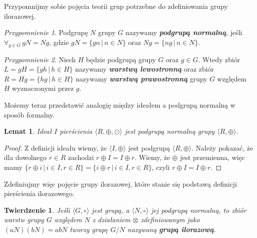 \documentclass[polish,declaration,shortabstract]{iithesis}
\theoremstyle{definition}
\theoremstyle{remark} \newtheorem{observation}{Obserwacja}
\theoremstyle{plain} \newtheorem{theorem}{Twierdzenie}
\theoremstyle{plain} \newtheorem{lemma}{Lemat}
\theoremstyle{remark} \newtheorem*{remark*}{Uwaga}
\theoremstyle{reminder} \newtheorem*{reminder*}{Przypomnienie}
\begin{document}
Przypomnijmy sobie pojęcia teorii grup potrzebne do zdefiniowania grupy ilorazowej.
\begin{reminder*}
	Podgrupę $N$ grupy $G$ nazywamy \textit{\textbf{podgrupą normalną}}, jeśli $\forall_{g \in G} \, gN = Ng$, gdzie $gN = \{gn \, | \, n \in N\}$ oraz $Ng = \{ng \, | \, n \in N\}$.
\end{reminder*}

\begin{reminder*}
    Niech $H$ będzie podgrupą grupy $G$ oraz $g \in G$. Wtedy zbiór 
    $L = gH = \{gh \, | \, h \in H\}$ nazywamy \textbf{\textit{warstwą lewostronną}} oraz zbiór $R = Hg = \{hg \, | \, h \in H\}$ nazywamy \textbf{\textit{warstwą prawostronną}} grupy $G$ względem $H$ wyznaczonymi przez $g$.
\end{reminder*}

Możemy teraz przedstawić analogię między ideałem a podgrupą normalną w sposób formalny.

\begin{lemma}
	Ideał $I$ pierścienia $\langle R, \oplus, \odot \rangle$ jest podgrupą normalną grupy $\langle R, \oplus \rangle$.
\end{lemma}

\begin{proof}
	Z definicji ideału wiemy, że $\langle I, \oplus \rangle$ jest podgrupą $\langle R, \oplus \rangle$. \newline
	Należy pokazać, że dla dowolnego $r \in R$ zachodzi $r \oplus I = I \oplus r$. Wiemy, że $\oplus$ jest przemienna, więc mamy ${\{r \oplus i \, | \, i \in I, r \in R\}} = {\{i \oplus r \, | \, i \in I, r \in R\}}$, czyli $r \oplus I = I \oplus r$.
\end{proof}

Zdefiniujmy więc pojęcie grupy ilorazowej, które stanie się podstawą definicji pierścienia ilorazowego.

\theoremstyle{theorem}\label{grup_ilo}
\begin{theorem}
	Jeśli $\langle G, \circ \rangle$ jest grupą, a $\langle N, \circ \rangle$ jej podgrupą normalną, to zbiór warstw grupy $G$ względem $N$ z działaniem $\otimes$ zdefiniowanym jako $(aN)(bN) = abN$ tworzy grupę $G/N$ nazywaną \textbf{\textit{grupą ilorazową}}.
\end{theorem}
\end{document}
